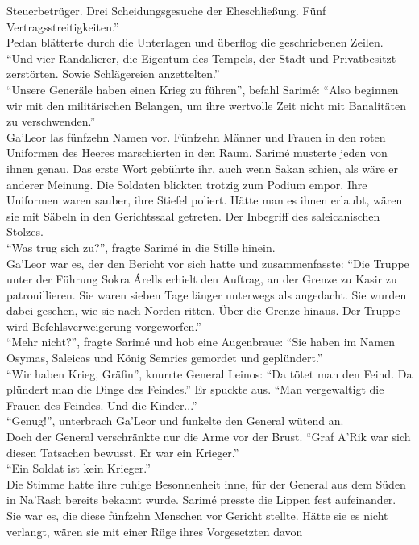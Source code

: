 Steuerbetrüger. Drei Scheidungsgesuche der Eheschließung. Fünf Vertragsstreitigkeiten.''\\
Pedan blätterte durch die Unterlagen und überflog die geschriebenen Zeilen. ``Und vier Randalierer, 
die Eigentum des Tempels, der Stadt und Privatbesitzt zerstörten. Sowie Schlägereien 
anzettelten.''\\
``Unsere Generäle haben einen Krieg zu führen'', befahl Sarimé: ``Also beginnen wir mit den 
militärischen Belangen, um ihre wertvolle Zeit nicht mit Banalitäten zu verschwenden.''\\
Ga'Leor las fünfzehn Namen vor. Fünfzehn Männer und Frauen in den roten Uniformen des Heeres 
marschierten in den Raum. Sarimé musterte jeden von ihnen genau. Das erste Wort gebührte ihr, auch 
wenn Sakan schien, als wäre er anderer Meinung. Die Soldaten blickten trotzig zum Podium empor. 
Ihre Uniformen waren sauber, ihre Stiefel poliert. Hätte man es ihnen erlaubt, wären sie mit 
Säbeln in den Gerichtssaal getreten. Der Inbegriff des saleicanischen Stolzes.\\
``Was trug sich zu?'', fragte Sarimé in die Stille hinein.\\
Ga'Leor war es, der den Bericht vor sich hatte und zusammenfasste: ``Die Truppe unter der Führung 
Sokra Árells erhielt den Auftrag, an der Grenze zu Kasir zu patrouillieren. Sie waren sieben Tage 
länger unterwegs als angedacht. Sie wurden dabei gesehen, wie sie nach Norden ritten. Über die 
Grenze hinaus. Der Truppe wird Befehlsverweigerung vorgeworfen.''\\
``Mehr nicht?'', fragte Sarimé und hob eine Augenbraue: ``Sie haben im Namen Osymas, Saleicas und 
König Semrics gemordet und geplündert.''\\
``Wir haben Krieg, Gräfin'', knurrte General Leinos: ``Da tötet man den Feind. Da plündert man 
die Dinge des Feindes.'' Er spuckte aus. ``Man vergewaltigt die Frauen des Feindes. Und die 
Kinder...''\\
``Genug!'', unterbrach Ga'Leor und funkelte den General wütend an.\\
Doch der General verschränkte nur die Arme vor der Brust. ``Graf A'Rik war sich diesen Tatsachen 
bewusst. Er war ein Krieger.''\\
``Ein Soldat ist kein Krieger.''\\
Die Stimme hatte ihre ruhige Besonnenheit inne, für der General aus dem Süden in Na'Rash bereits 
bekannt wurde. Sarimé presste die Lippen fest aufeinander. Sie war es, die diese fünfzehn Menschen 
vor Gericht stellte. Hätte sie es nicht verlangt, wären sie mit einer Rüge ihres Vorgesetzten davon 

